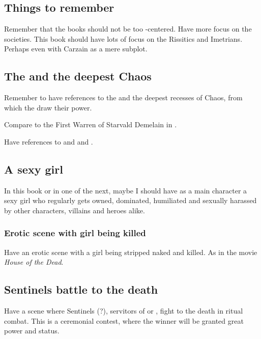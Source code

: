 \subsection{Things to remember}
Remember that the books should not be too \human-centered. 
Have more focus on the \scathaese{} societies. 
This book should have lots of focus on the Rissitics and Imetrians. 
Perhaps even with Carzain as a mere subplot. 









\subsection{The \xzaishanns{} and the deepest Chaos}
Remember to have references to the \xzaishanns{} and the deepest recesses of Chaos, from which the \dragons{} draw their power. 

Compare to the First Warren of Starvald Demelain in \cite{StevenEriksonIanCameronEsslemont:MalazanBookoftheFallen}.

Have references to  and  and . 









\subsection{A sexy girl}
In this book or in one of the next, maybe I should have as a main character a sexy girl who regularly gets owned, dominated, humiliated and sexually harassed by other characters, villains and heroes alike. 





\subsubsection{Erotic scene with girl being killed}
Have an erotic scene with a girl being stripped naked and killed. As in the movie \emph{House of the Dead}. 










\subsection{Sentinels battle to the death}
Have a scene where Sentinels (\rachyth?), servitors of \Secherdamon{} or \Vizsherioch, fight to the death in ritual combat. This is a ceremonial contest, where the winner will be granted great power and status. 

